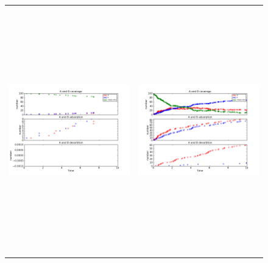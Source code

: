 \documentclass[11pt]{article}
\begin{document}
\setlength{\unitlength}{1in}
\begin{figure}[h!]
\begin{tabular}{cc}
\includegraphics[width=3.5in, height=4.2in]{./coadsorb/AtoBcoadsorb10x10_101_Bdes2x__EA5E3_EBx10E3_1.png} &
\includegraphics[width=3.5in, height=4.2in]{./coadsorb/AtoBcoadsorb10x10_201_Bdes2x__EA5E3_EBx10E3_1.png} \\

\end{tabular}
\end{figure}
\end{document}
